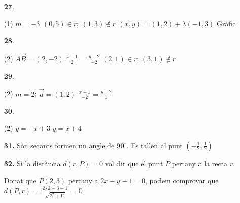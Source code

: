 \documentclass[a4paper, pdf, twoside]{book}
\begin{document}
\begin{multicols}{2}
\begin{enumerate}
 \item[\fontfamily{phv}\selectfont\color{blue}\textbf{27}. ] 
 \begin{tasks}[column-sep=1em, item-indent=1.3333em](1)
	 \task $m=-3$
	 \task $(0,5)\in r$; $(1,3)\notin r$
	 \task $(x,y)=(1,2)+\lambda (-1,3)$
	 \task Gràfic
\end{tasks}
 \end{enumerate}
\begin{enumerate}
\vspace{0.25cm}



 \item[\fontfamily{phv}\selectfont\color{blue}\textbf{28}. ] 
 \begin{tasks}[column-sep=1em, item-indent=1.3333em](2)
	 \task $\overrightarrow {AB}=(2,-2)$
	 \task* $\frac {x-1}{2}=\frac {y-2}{-2}$
	 \task $(2,1)\in r$; $(3,1)\notin r$
\end{tasks}
\vspace{0.25cm}



 \item[\fontfamily{phv}\selectfont\color{blue}\textbf{29}. ] 
 \begin{tasks}[column-sep=1em, item-indent=1.3333em](2)
	 \task $m=2$; $\vec d =(1,2)$
	 \task* $\frac {x-1}{-2}=\frac {y-2}{1}$
\end{tasks}
\vspace{0.25cm}



 \item[\fontfamily{phv}\selectfont\color{blue}\textbf{30}. ] 
 \begin{tasks}[column-sep=1em, item-indent=1.3333em](2)
	 \task $y=-x+3$
	 \task $y=x+4$
\end{tasks}
\vspace{0.25cm}
\item[\fontfamily{phv}\selectfont\color{blue}\textbf{31. }] 
Són secants formen un angle de $90^\circ $. Es tallen al punt $(-\frac {1}{2},\frac {1}{2})$
\vspace{0.25cm}
\item[\fontfamily{phv}\selectfont\color{blue}\textbf{32. }] 
Si la distància $d(r, P)=0$ vol dir que el punt $P$ pertany a la recta $r$. \par Donat que $P(2,3)$ pertany a $2x-y-1=0$, podem comprovar que $d(P, r)=\frac {|2\cdot 2 - 3 -1|}{\sqrt {2^2+1^2}}=0$
\vspace{0.25cm}



\end{enumerate}
\end{multicols}
\end{document}
